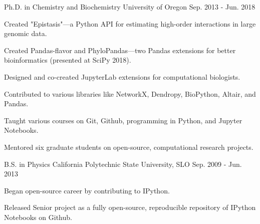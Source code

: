 \begin{edu}

  \cvedu
    {Ph.D. in Chemistry and Biochemistry} %
    {University of Oregon} %
    {Sep. 2013 - Jun. 2018} %
    {
      \begin{cvitems} %
        \item {Created "Epistasis"—a Python API for estimating high-order interactions in large genomic data.}
        \item {Created Pandas-flavor and PhyloPandas—two Pandas extensions for better bioinformatics (presented at SciPy 2018).}
        \item {Designed and co-created JupyterLab extensions for computational biologists.}
        \item {Contributed to various libraries like NetworkX, Dendropy, BioPython, Altair, and Pandas.}
        \item {Taught various courses on Git, Github, programming in Python, and Jupyter Notebooks.}
        \item {Mentored six graduate students on open-source, computational research projects.}
      \end{cvitems}
    }

  \cvedu    
    {B.S. in Physics} %
    {California Polytechnic State University, SLO} %
    {Sep. 2009 - Jun. 2013} %
    {
      \begin{cvitems} %
        \item {Began open-source career by contributing to IPython.}
        \item {Released Senior project as a fully open-source, reproducible repository of IPython Notebooks on Github.}
      \end{cvitems}
    }
\end{edu}
